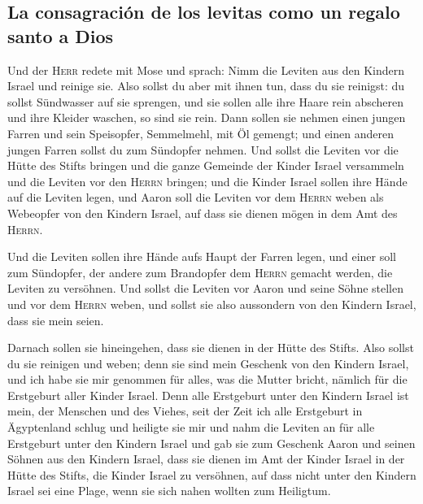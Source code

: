 \hypertarget{la-consagraciuxf3n-de-los-levitas-como-un-regalo-santo-a-dios}{%
\subsection{La consagración de los levitas como un regalo santo a
Dios}\label{la-consagraciuxf3n-de-los-levitas-como-un-regalo-santo-a-dios}}

 Und der \textsc{Herr} redete mit Mose und sprach:
 Nimm die Leviten aus den Kindern Israel und reinige sie.
 Also sollst du aber mit ihnen tun, dass du sie reinigst:
du sollst Sündwasser auf sie sprengen, und sie sollen alle ihre Haare
rein abscheren und ihre Kleider waschen, so sind sie rein.
 Dann sollen sie nehmen einen jungen Farren und sein
Speisopfer, Semmelmehl, mit Öl gemengt; und einen anderen jungen Farren
sollst du zum Sündopfer nehmen.  Und sollst die Leviten
vor die Hütte des Stifts bringen und die ganze Gemeinde der Kinder
Israel versammeln  und die Leviten vor den \textsc{Herrn}
bringen; und die Kinder Israel sollen ihre Hände auf die Leviten legen,
 und Aaron soll die Leviten vor dem \textsc{Herrn} weben
als Webeopfer von den Kindern Israel, auf dass sie dienen mögen in dem
Amt des \textsc{Herrn}.

 Und die Leviten sollen ihre Hände aufs Haupt der Farren
legen, und einer soll zum Sündopfer, der andere zum Brandopfer dem
\textsc{Herrn} gemacht werden, die Leviten zu versöhnen. 
Und sollst die Leviten vor Aaron und seine Söhne stellen und vor dem
\textsc{Herrn} weben,  und sollst sie also aussondern von
den Kindern Israel, dass sie mein seien.

 Darnach sollen sie hineingehen, dass sie dienen in der
Hütte des Stifts. Also sollst du sie reinigen und weben; 
denn sie sind mein Geschenk von den Kindern Israel, und ich habe sie mir
genommen für alles, was die Mutter bricht, nämlich für die Erstgeburt
aller Kinder Israel.  Denn alle Erstgeburt unter den
Kindern Israel ist mein, der Menschen und des Viehes, seit der Zeit ich
alle Erstgeburt in Ägyptenland schlug und heiligte sie mir
 und nahm die Leviten an für alle Erstgeburt unter den
Kindern Israel  und gab sie zum Geschenk Aaron und seinen
Söhnen aus den Kindern Israel, dass sie dienen im Amt der Kinder Israel
in der Hütte des Stifts, die Kinder Israel zu versöhnen, auf dass nicht
unter den Kindern Israel sei eine Plage, wenn sie sich nahen wollten zum
Heiligtum.

